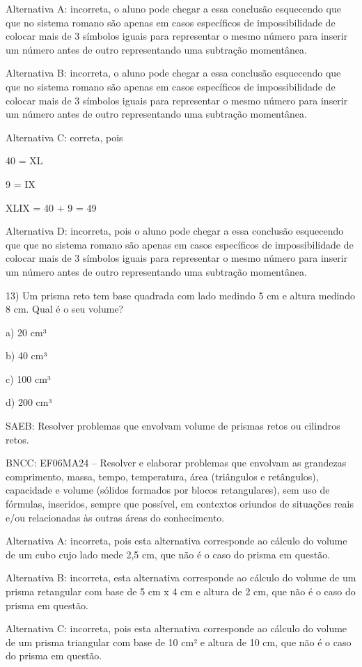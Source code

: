Alternativa A: incorreta, o aluno pode chegar a essa conclusão
esquecendo que que no sistema romano são apenas em casos específicos de
impossibilidade de colocar mais de 3 símbolos iguais para representar o
mesmo número para inserir um número antes de outro representando uma
subtração momentânea.

Alternativa B: incorreta, o aluno pode chegar a essa conclusão
esquecendo que que no sistema romano são apenas em casos específicos de
impossibilidade de colocar mais de 3 símbolos iguais para representar o
mesmo número para inserir um número antes de outro representando uma
subtração momentânea.

Alternativa C: correta, pois

40 = XL

9 = IX

XLIX = 40 + 9 = 49

Alternativa D: incorreta, pois o aluno pode chegar a essa conclusão
esquecendo que que no sistema romano são apenas em casos específicos de
impossibilidade de colocar mais de 3 símbolos iguais para representar o
mesmo número para inserir um número antes de outro representando uma
subtração momentânea.

13) Um prisma reto tem base quadrada com lado medindo 5 cm e altura
medindo 8 cm. Qual é o seu volume?

a) 20 cm³

b) 40 cm³

c) 100 cm³

d) 200 cm³

SAEB: Resolver problemas que envolvam volume de prismas retos ou
cilindros retos.

BNCC: EF06MA24 -- Resolver e elaborar problemas que envolvam as
grandezas comprimento, massa, tempo, temperatura, área (triângulos e
retângulos), capacidade e volume (sólidos formados por blocos
retangulares), sem uso de fórmulas, inseridos, sempre que possível, em
contextos oriundos de situações reais e/ou relacionadas às outras áreas
do conhecimento.

Alternativa A: incorreta, pois esta alternativa corresponde ao cálculo
do volume de um cubo cujo lado mede 2,5 cm, que não é o caso do prisma
em questão.

Alternativa B: incorreta, esta alternativa corresponde ao cálculo do
volume de um prisma retangular com base de 5 cm x 4 cm e altura de 2 cm,
que não é o caso do prisma em questão.

Alternativa C: incorreta, pois esta alternativa corresponde ao cálculo
do volume de um prisma triangular com base de 10 cm² e altura de 10 cm,
que não é o caso do prisma em questão.

